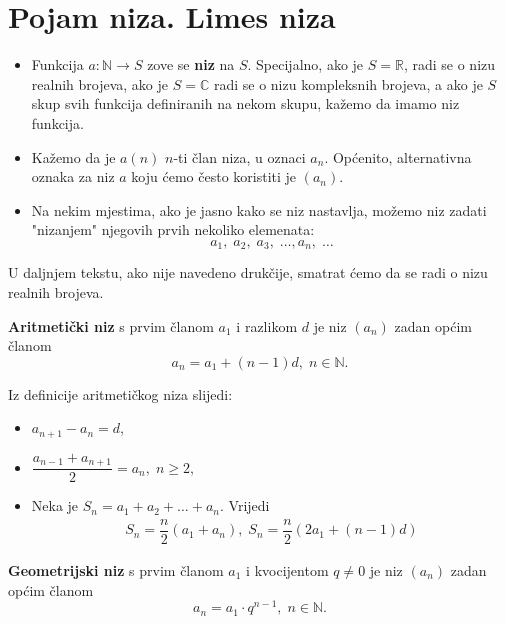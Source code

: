 \section{Pojam niza. Limes niza}
\begin{definition} \textbf{}
\begin{itemize}
\item Funkcija \(a : \mathbb{N}\to S\) zove se \textbf{niz} na \(S\). Specijalno, ako je \(S=\mathbb{R}\), radi se o nizu realnih brojeva, ako je \(S=\mathbb{C}\) radi se o nizu kompleksnih brojeva, a ako je \(S\) skup svih funkcija definiranih na nekom skupu, kažemo da imamo niz funkcija.

\item Kažemo da je \(a(n)\) \(n\)-ti član niza, u oznaci \(a_n\). Općenito, alternativna oznaka za niz \(a\) koju ćemo često koristiti je \((a_n)\). 

\item Na nekim mjestima, ako je jasno kako se niz nastavlja, možemo niz zadati "nizanjem" njegovih prvih nekoliko elemenata:
\[a_1,\; a_2,\; a_3,\;\dots, a_n,\; \dots \]
\end{itemize}
\end{definition}
U daljnjem tekstu, ako nije navedeno drukčije, smatrat ćemo da se radi o nizu realnih brojeva.
\begin{definition}
\textbf{Aritmetički niz} s prvim članom \(a_1\) i razlikom \(d\) je niz \((a_n)\) zadan općim članom
\[a_n=a_1+(n-1)d, \; n\in \mathbb{N}.\]
\end{definition}

\noindent Iz definicije aritmetičkog niza slijedi:
\begin{itemize}
\item \(a_{n+1}-a_n=d\),
\item \(\dfrac{a_{n-1}+a_{n+1}}{2}=a_n, \; n\geq 2,\)
\item Neka je \(S_n=a_1+a_2+\dots+a_n\). Vrijedi
\begin{gather}
\label{arsum}
S_n=\dfrac{n}{2}\left(a_1+a_n\right), \; S_n=\dfrac{n}{2}\left(2a_1+(n-1)d\right)
\end{gather}
\end{itemize}
\begin{definition}
\label{17}
\textbf{Geometrijski niz} s prvim članom \(a_1\) i kvocijentom \(q\neq 0\) je niz \((a_n)\) zadan općim članom
\[a_n=a_1\cdot q^{n-1}, \; n\in \mathbb{N}.\]
\end{definition}

